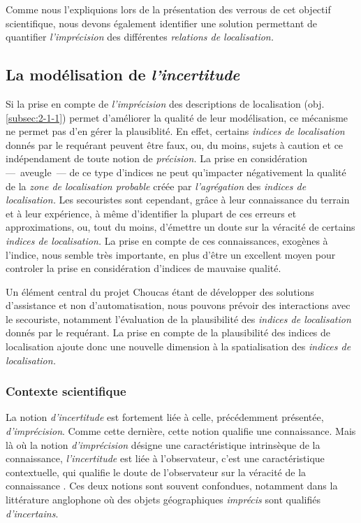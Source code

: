 Comme nous l'expliquions lors de la présentation des verrous de cet
objectif scientifique, nous devons également identifier une solution
permettant de quantifier \emph{l'imprécision} des différentes
\emph{relations de localisation.}

\subsection{La modélisation de \emph{l'incertitude}}
\label{subsec:2-1-3}

Si la prise en compte de \emph{l'imprécision} des descriptions de
localisation (obj. \ref{subsec:2-1-1}) permet d'améliorer la qualité
de leur modélisation, ce mécanisme ne permet pas d'en gérer la
plausiblité. En effet, certains \emph{indices de localisation} donnés
par le requérant peuvent être faux, ou, du moins, sujets à caution et
ce indépendament de toute notion de \emph{précision.} La prise en
considération ---~aveugle~--- de ce type d'indices ne peut qu'impacter
négativement la qualité de la \emph{zone de localisation probable}
créée par \emph{l'agrégation} des \emph{indices de localisation.} Les
secouristes sont cependant, grâce à leur connaissance du terrain et à
leur expérience, à même d'identifier la plupart de ces erreurs et
approximations, ou, tout du moins, d’émettre un doute sur la véracité
de certains \emph{indices de localisation.} La prise en compte de ces
connaissances, exogènes à l'indice, nous semble très importante, en
plus d'être un excellent moyen pour controler la prise en
considération d'indices de mauvaise qualité.

Un élément central du projet Choucas étant de développer des solutions
d'assistance et non d'automatisation, nous pouvons prévoir des
interactions avec le secouriste, notamment l'évaluation de la
plausibilité des \emph{indices de localisation} donnés par le
requérant. La prise en compte de la plausibilité des indices de
localisation ajoute donc une nouvelle dimension à la spatialisation
des \emph{indices de localisation.}

\subsubsection{Contexte scientifique}

La notion \emph{d'incertitude} est fortement liée à celle,
précédemment présentée, \emph{d'imprécision}. Comme cette dernière,
cette notion qualifie une connaissance. Mais là où la notion
\emph{d'imprécision} désigne une caractéristique intrinsèque de la
connaissance, \emph{l'incertitude} est liée à l'observateur, c'est une
caractéristique contextuelle, qui qualifie le doute de l'observateur
sur la véracité de la connaissance \autocite{Bunel2020}. Ces deux
notions sont souvent confondues, notamment dans la littérature
anglophone où des objets géographiques \emph{imprécis} sont qualifiés
\emph{d'incertains}.

